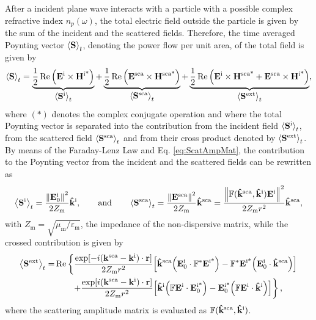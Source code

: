 After a incident plane wave interacts with a particle with a possible complex refractive index $n_p(\omega)$, the total electric field outside the particle is given by the sum of the incident and the scattered fields. Therefore, the time averaged Poynting vector $\ev{\vb{S}}_t$, denoting the power flow per unit area, of the total field is given by
%
 \begin{align}
	\ev{\vb{S}}_t
		= \underbrace{\frac12 \Re \qty(\vb{E}^\text{i}\times\vb{H}^\text{i*})}_{\text{\normalsize $\ev{\vb{S}^\text{i}}_t $}} +
		\underbrace{\frac12 \Re \qty(\vb{E}^\text{sca}\times\vb{H}^\text{sca*})}_{\text{\normalsize $\ev{\vb{S}^\text{sca}}_t $}}+
		\underbrace{	\frac12 \Re\qty(\vb{E}^\text{i}\times\vb{H}^\text{sca*} + \vb{E}^\text{sca}\times\vb{H}^\text{i*})}_{\text{\normalsize$\ev{\vb{S}^\text{ext}}_t$}},
 \label{eq:Stot}
 \end{align}
%
where $(*)$ denotes the complex conjugate operation and where the total Poynting vector is separated into the contribution from the incident field $\ev{\vb{S}^\text{i}}_t$, from the scattered field $\ev{\vb{S}^\text{sca}}_t$ and from their cross product denoted by $\ev{\vb{S}^\text{ext}}_t$. By means of the Faraday-Lenz Law and Eq. \eqref{eq:ScatAmpMat}, the  contribution to the Poynting vector from the incident and the scattered fields can be rewritten as
%
 \begin{equation}
	\ev{\vb{S}^\text{i}}_t = \frac{\norm{\vb{E}_0^\text{i}}^2}{2 Z_\text{m}}\vu{k}^\text{i},
		\qquad\text{and}\qquad
	\ev{\vb{S}^\text{sca}}_t = \frac{\norm{\vb{E}^\text{sca}}^2}{2 Z_\text{m}}\vu{k}^\text{sca}
						=  \frac{\norm{\mathbb{F}(\vu{k}^\text{sca},\vu{k}^\text{i})\vb{E}^\text{i}}^2}{2 Z_\text{m}r^2}\vu{k}^\text{sca},
 \label{eq:AvePoyntingISca}
 \end{equation}
%
with $Z_\text{m} = \sqrt{\mu_\text{m}/\varepsilon_\text{m}}$, the impedance of the non-dispersive matrix, while the crossed contribution is given by
%
 \begin{align}
 \ev{\vb{S}^\text{ext}}_t = &\Re\left\{
								\frac{\exp[-i(\vb{k}^\text{sca}-\vb{k}^\text{i})\cdot\vb{r}]}{2 Z_\text{m}r^2}
								\qty[\vu{k}^\text{sca}\qty(\vb{E}_0^\text{i}\cdot \mathbb{F}^*\vb{E}^\text{i*})
									-\mathbb{F}^*\vb{E}^\text{i*}	\qty(\vb{E}^\text{i}_0\cdot\vu{k}^\text{sca})]
							 \right.\notag	\\
							&\hspace{2em}\left.
								+\frac{\exp[i(\vb{k}^\text{sca}-\vb{k}^\text{i})\cdot\vb{r}]}{2 Z_\text{m}r^2}
								\qty[\vu{k}^\text{i}\qty(\mathbb{F}\vb{E}^\text{i}\cdot\vb{E}^\text{i*}_0)
									-\vb{E}^\text{i*}_0 \qty(\mathbb{F}\vb{E}^\text{i}\cdot\vu{k}^\text{i})]	\right\},
 \label{eq:AvePoyntingExt}
 \end{align}
%
where the scattering amplitude matrix is evaluated as $\mathbb{F}(\vu{k}^\text{sca},\vu{k}^\text{i})$.

